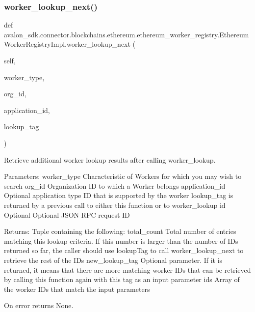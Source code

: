 \subsubsection{\texorpdfstring{worker\+\_\+lookup\+\_\+next()}{worker\_lookup\_next()}}
{\footnotesize\ttfamily def avalon\+\_\+sdk.\+connector.\+blockchains.\+ethereum.\+ethereum\+\_\+worker\+\_\+registry.\+Ethereum\+Worker\+Registry\+Impl.\+worker\+\_\+lookup\+\_\+next (\begin{DoxyParamCaption}\item[{}]{self,  }\item[{}]{worker\+\_\+type,  }\item[{}]{org\+\_\+id,  }\item[{}]{application\+\_\+id,  }\item[{}]{lookup\+\_\+tag }\end{DoxyParamCaption})}

\begin{DoxyVerb}Retrieve additional worker lookup results after calling worker_lookup.

Parameters:
worker_type         Characteristic of Workers for which you may wish
            to search
org_id              Organization ID to which a Worker belongs
application_id      Optional application type ID that is
            supported by the worker
lookup_tag          is returned by a previous call to either this
            function or to worker_lookup
id                  Optional Optional JSON RPC request ID


Returns:
Tuple containing the following:
total_count    Total number of entries matching this lookup
       criteria.  If this number is larger than the number
       of IDs returned so far, the caller should use
       lookupTag to call worker_lookup_next to retrieve
       the rest of the IDs
new_lookup_tag Optional parameter. If it is returned, it
       means that there are more matching worker IDs that
       can be retrieved by calling this function again with
       this tag as an input parameter
ids            Array of the worker IDs that match the input parameters

On error returns None.
\end{DoxyVerb}
 \mbox{\label{classavalon__sdk_1_1connector_1_1blockchains_1_1ethereum_1_1ethereum__worker__registry_1_1EthereumWorkerRegistryImpl_a2b7e710b8b613e1566918b13f1e85a65}} 
